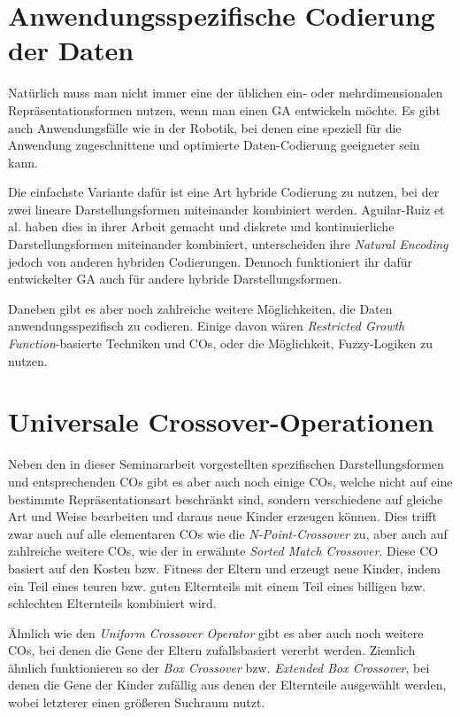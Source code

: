\section{Anwendungsspezifische Codierung der Daten}
\label{sec:AnwSpezCod}

	Natürlich muss man nicht immer eine der üblichen ein- oder mehrdimensionalen Repräsentationsformen nutzen, wenn man einen GA entwickeln möchte. Es gibt auch Anwendungsfälle wie \zB in der Robotik, \cite{GABook} bei denen eine speziell für die Anwendung zugeschnittene und optimierte Daten-Codierung geeigneter sein kann.
	
	Die einfachste Variante dafür ist eine Art hybride Codierung zu nutzen, bei der zwei lineare Darstellungsformen miteinander kombiniert werden. Aguilar-Ruiz et al. haben dies in ihrer Arbeit \cite{NaturalCoding} gemacht und diskrete und kontinuierliche Darstellungsformen miteinander kombiniert, unterscheiden ihre \textit{Natural Encoding} jedoch von anderen hybriden Codierungen. Dennoch funktioniert ihr dafür entwickelter GA auch für andere hybride Darstellungsformen.
	
	Daneben gibt es aber noch zahlreiche weitere Möglichkeiten, die Daten anwendungsspezifisch zu codieren. Einige davon wären \zB \textit{Restricted Growth Function}-basierte Techniken und COs, \cite{RestrictedGrowthFunction} oder die Mög\-lich\-keit, Fuzzy-Logiken zu nutzen. \cite{FuzzyEncoding}

\section{Universale Crossover-Operationen}
\label{sec:UnivOp}

	Neben den in dieser Seminararbeit vorgestellten spezifischen Darstellungsformen und entsprechenden COs gibt es aber auch noch einige COs, welche nicht auf eine bestimmte Repräsentationsart beschränkt sind, sondern verschiedene auf gleiche Art und Weise bearbeiten und daraus neue Kinder erzeugen können. Dies trifft zwar auch auf alle elementaren COs wie die \textit{N-Point-Crossover} zu, aber auch auf zahlreiche weitere COs, wie \zB der in \cite{COforPermutations} erwähnte \textit{Sorted Match Crossover}. Diese CO basiert auf den Kosten bzw. Fitness der Eltern und erzeugt neue Kinder, indem ein Teil eines teuren bzw. guten Elternteils mit einem Teil eines billigen bzw. schlechten Elternteils kombiniert wird.
	
	Ähnlich wie den \textit{Uniform Crossover Operator} gibt es aber auch noch weitere COs, bei denen die Gene der Eltern zufallsbasiert vererbt werden. Ziemlich ähnlich funktionieren so \zB der \textit{Box Crossover} bzw. \textit{Extended Box Crossover}, bei denen die Gene der Kinder zufällig aus denen der Elternteile ausgewählt werden, wobei letzterer einen größeren Suchraum nutzt. \cite{BoxCrossover}
	
